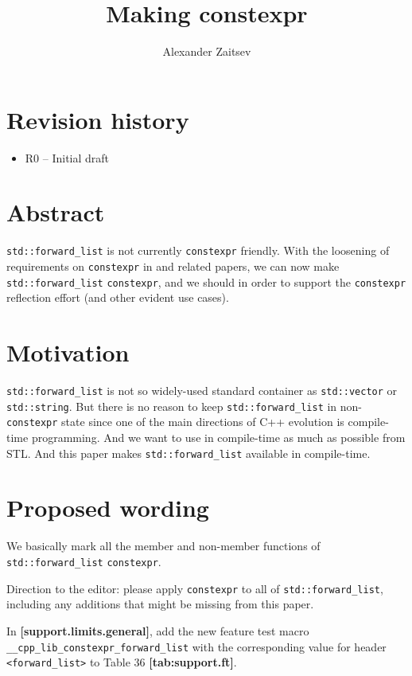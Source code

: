 \documentclass{wg21}
\title{Making \cc{std::forward_list} constexpr}
\author{Alexander Zaitsev}{zamazan4ik@tut.by, zamazan4ik@gmail.com}
\newcommand{\cc}[1]{\texttt{#1}}
\begin{document}
\maketitle

\section{Revision history}
\begin{itemize}
  \item R0 -- Initial draft
\end{itemize}


\section{Abstract}
\cc{std::forward_list} is not currently \cc{constexpr} friendly. With the loosening
of requirements on \cc{constexpr} in \cite{P0784R1} and related papers, we
can now make \cc{std::forward_list} \cc{constexpr}, and we should in order to support
the \cc{constexpr} reflection effort (and other evident use cases).

\section{Motivation}
\cc{std::forward_list} is not so widely-used standard container as \cc{std::vector} or \cc{std::string}. But there is no reason to keep \cc{std::forward_list} in non-\cc{constexpr} state since one of the main directions of C++ evolution is compile-time programming. And we want to use in compile-time as much as possible from STL. And this paper makes \cc{std::forward_list} available in compile-time.

\section{Proposed wording}
We basically mark all the member and non-member functions of \cc{std::forward_list} \cc{constexpr}.

Direction to the editor: please apply \cc{constexpr} to all of \cc{std::forward_list},
including any additions that might be missing from this paper.

In \textbf{[support.limits.general]}, add the new feature test macro
\cc{__cpp_lib_constexpr_forward_list} with the corresponding value for header
\cc{<forward_list>} to Table 36 \textbf{[tab:support.ft]}.
\end{document}
